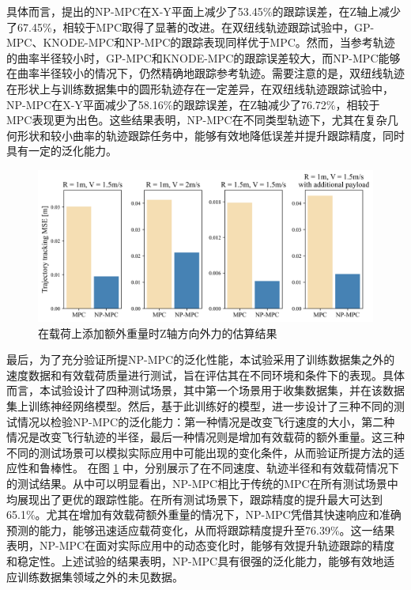 \documentclass[lang=chs, degree=master, blindreview=false, winfonts=true]{yanputhesis}
\begin{document}
具体而言，提出的NP-MPC在X-Y平面上减少了53.45\%的跟踪误差，在Z轴上减少了67.45\%，相较于MPC取得了显著的改进。在双纽线轨迹跟踪试验中，GP-MPC、KNODE-MPC和NP-MPC的跟踪表现同样优于MPC。然而，当参考轨迹的曲率半径较小时，GP-MPC和KNODE-MPC的跟踪误差较大，而NP-MPC能够在曲率半径较小的情况下，仍然精确地跟踪参考轨迹。需要注意的是，双纽线轨迹在形状上与训练数据集中的圆形轨迹存在一定差异，在双纽线轨迹跟踪试验中，NP-MPC在X-Y平面减少了58.16\%的跟踪误差，在Z轴减少了76.72\%，相较于MPC表现更为出色。这些结果表明，NP-MPC在不同类型轨迹下，尤其在复杂几何形状和较小曲率的轨迹跟踪任务中，能够有效地降低误差并提升跟踪精度，同时具有一定的泛化能力。

\begin{figure}[hbt!]
	\centering
	\includegraphics[width=34pc]{picture/kk/prediction_res.png} 
	\caption{在载荷上添加额外重量时Z轴方向外力的估算结果} 
	\label{prediction_res}
\end{figure}
最后，为了充分验证所提NP-MPC的泛化性能，本试验采用了训练数据集之外的速度数据和有效载荷质量进行测试，旨在评估其在不同环境和条件下的表现。具体而言，本试验设计了四种测试场景，其中第一个场景用于收集数据集，并在该数据集上训练神经网络模型。然后，基于此训练好的模型，进一步设计了三种不同的测试情况以检验NP-MPC的泛化能力：第一种情况是改变飞行速度的大小，第二种情况是改变飞行轨迹的半径，最后一种情况则是增加有效载荷的额外重量。这三种不同的测试场景可以模拟实际应用中可能出现的变化条件，从而验证所提方法的适应性和鲁棒性。
在图 \ref{prediction_res} 中，分别展示了在不同速度、轨迹半径和有效载荷情况下的测试结果。从中可以明显看出，NP-MPC相比于传统的MPC在所有测试场景中均展现出了更优的跟踪性能。在所有测试场景下，跟踪精度的提升最大可达到65.1\%。尤其在增加有效载荷额外重量的情况下，NP-MPC凭借其快速响应和准确预测的能力，能够迅速适应载荷变化，从而将跟踪精度提升至76.39\%。这一结果表明，NP-MPC在面对实际应用中的动态变化时，能够有效提升轨迹跟踪的精度和稳定性。上述试验的结果表明，NP-MPC具有很强的泛化能力，能够有效地适应训练数据集领域之外的未见数据。
\end{document}
